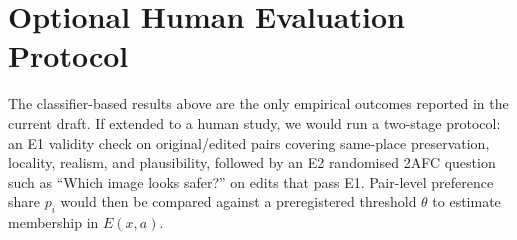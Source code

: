 \section{Optional Human Evaluation Protocol}

The classifier-based results above are the only empirical outcomes
reported in the current draft. If extended to a human study, we would
run a two-stage protocol: an E1 validity check on original/edited pairs
covering same-place preservation, locality, realism, and plausibility,
followed by an E2 randomised 2AFC question such as ``Which image looks
safer?'' on edits that pass E1. Pair-level preference share $p_i$ would
then be compared against a preregistered threshold $\theta$ to estimate
membership in $E(x,a)$.
